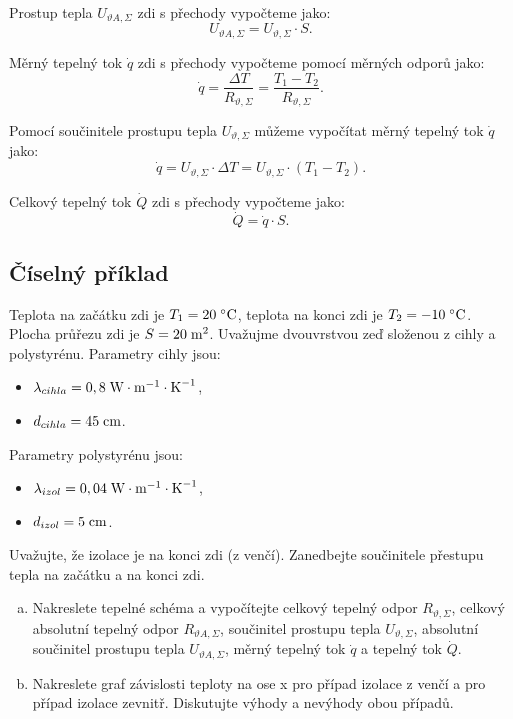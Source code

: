 \documentclass{article}
\begin{document}
Prostup tepla $U_{\vartheta A,\Sigma}$ zdi s přechody vypočteme jako:
$$
    U_{\vartheta A,\Sigma} = U_{\vartheta,\Sigma} \cdot S.
$$

Měrný tepelný tok $\dot{q}$ zdi s přechody vypočteme pomocí měrných odporů jako:
$$
    \dot{q} = \frac{\Delta T}{R_{\vartheta,\Sigma}} = \frac{T_1 - T_2}{R_{\vartheta,\Sigma}}.
$$

Pomocí součinitele prostupu tepla $U_{\vartheta,\Sigma}$ můžeme vypočítat měrný tepelný tok $\dot{q}$ jako:
$$
    \dot{q} = U_{\vartheta,\Sigma} \cdot \Delta T = U_{\vartheta,\Sigma} \cdot (T_1 - T_2).
$$

Celkový tepelný tok $\dot{Q}$ zdi s přechody vypočteme jako:
$$
    \dot{Q} = \dot{q} \cdot S.
$$



\subsection{Číselný příklad}
Teplota na začátku zdi je $T_1 = 20 \; ^\circ \textrm{C}$, teplota na konci zdi je $T_2 = -10 \; ^\circ \textrm{C}$. Plocha průřezu zdi je $S = 20 \; \textrm{m}^{\textrm{2}}$. Uvažujme dvouvrstvou zeď složenou z cihly a polystyrénu. Parametry cihly jsou:
\begin{itemize}
    \item $\lambda_{cihla} = 0,8 \; \textrm{W} \cdot \textrm{m}^{-1} \cdot \textrm{K}^{-1}$,
    \item $d_{cihla} = 45 \; \textrm{cm}$.
\end{itemize}

Parametry polystyrénu jsou:
\begin{itemize}
    \item $\lambda_{izol} = 0,04 \; \textrm{W} \cdot \textrm{m}^{-1} \cdot \textrm{K}^{-1}$,
    \item $d_{izol} = 5 \; \textrm{cm}$.
\end{itemize}

Uvažujte, že izolace je na konci zdi (z venčí). Zanedbejte součinitele přestupu tepla na začátku a na konci zdi.
\begin{enumerate}[a)]
    \item Nakreslete tepelné schéma a vypočítejte celkový tepelný odpor $R_{\vartheta,\Sigma}$, celkový absolutní tepelný odpor $R_{\vartheta A,\Sigma}$, součinitel prostupu tepla $U_{\vartheta,\Sigma}$, absolutní součinitel prostupu tepla $U_{\vartheta A,\Sigma}$, měrný tepelný tok $\dot{q}$ a tepelný tok $\dot{Q}$.
    \item Nakreslete graf závislosti teploty na ose x pro případ izolace z venčí a pro případ izolace zevnitř. Diskutujte výhody a nevýhody obou případů.
\end{enumerate}
\end{document}
